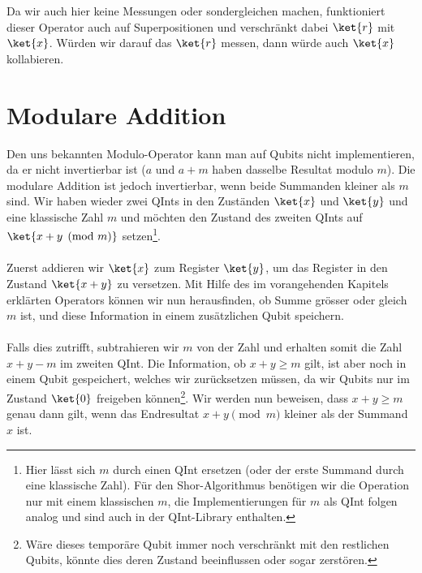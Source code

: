 Da wir auch hier keine Messungen oder sondergleichen machen, funktioniert dieser Operator auch auf Superpositionen und verschränkt dabei $\ket{r}$ mit $\ket{x}$. Würden wir darauf das $\ket{r}$ messen, dann würde auch $\ket{x}$ kollabieren.

\section{Modulare Addition}
Den uns bekannten Modulo-Operator kann man auf Qubits nicht implementieren, da er nicht invertierbar ist ($a$ und $a + m$ haben dasselbe Resultat modulo $m$). Die modulare Addition ist jedoch invertierbar, wenn beide Summanden kleiner als $m$ sind. Wir haben wieder zwei QInts in den Zuständen $\ket{x}$ und $\ket{y}$ und eine klassische Zahl $m$ und möchten den Zustand des zweiten QInts auf $\ket{x + y \pmod{m}}$ setzen\footnote{Hier lässt sich $m$ durch einen QInt ersetzen (oder der erste Summand durch eine klassische Zahl). Für den Shor-Algorithmus benötigen wir die Operation nur mit einem klassischen $m$, die Implementierungen für $m$ als QInt folgen analog und sind auch in der QInt-Library enthalten.}.

\paragraph{}

Zuerst addieren wir $\ket{x}$ zum Register $\ket{y}$, um das Register in den Zustand $\ket{x + y}$ zu versetzen. Mit Hilfe des im vorangehenden Kapitels erklärten Operators können wir nun herausfinden, ob Summe grösser oder gleich $m$ ist, und diese Information in einem zusätzlichen Qubit speichern.

\paragraph{}

Falls dies zutrifft, subtrahieren wir $m$ von der Zahl und erhalten somit die Zahl $x + y - m$ im zweiten QInt. Die Information, ob $x + y \geq m$ gilt, ist aber noch in einem Qubit gespeichert, welches wir zurücksetzen müssen, da wir Qubits nur im Zustand $\ket{0}$ freigeben können\footnote{Wäre dieses temporäre Qubit immer noch verschränkt mit den restlichen Qubits, könnte dies deren Zustand beeinflussen oder sogar zerstören.}. Wir werden nun beweisen, dass $x + y \geq m$ genau dann gilt, wenn das Endresultat ${x + y \pmod{m}}$ kleiner als der Summand $x$ ist. 

